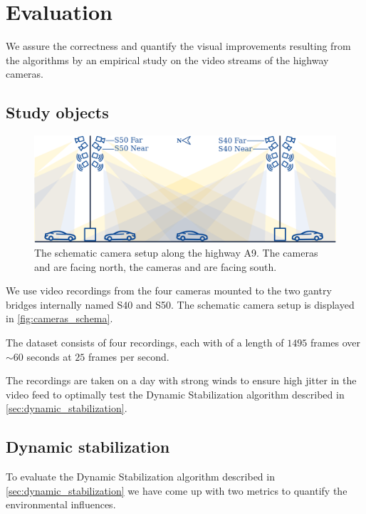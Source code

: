 
\section{Evaluation}

We assure the correctness and quantify the visual improvements resulting from the algorithms by an empirical study on the video streams of the highway cameras.

\subsection{Study objects}
\begin{figure}[t]
    \begin{center}
       \includegraphics[width=\linewidth]{images/cameras_schema.png}
    \end{center}
       \caption{The schematic camera setup along the highway A9.
       The cameras  and  are facing north,
       the cameras  and  are facing south.}
    \label{fig:cameras_schema}
    \end{figure}

We use video recordings from the four cameras mounted to the two gantry bridges internally named S40 and S50. The schematic camera setup is displayed in \autoref{fig:cameras_schema}.

The dataset consists of four recordings, each with of a length of $1495$ frames over $\sim 60$ seconds at $25$ frames per second.

The recordings are taken on a day with strong winds to ensure high jitter in the video feed to optimally test the Dynamic Stabilization algorithm described in \autoref{sec:dynamic_stabilization}. 

\subsection{Dynamic stabilization}
To evaluate the Dynamic Stabilization algorithm described in \autoref{sec:dynamic_stabilization} we have come up with two metrics to quantify the environmental influences.

